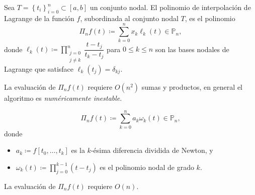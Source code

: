 \begin{frame}
	\begin{definition}
		Sea
		\begin{math}
			T=
			{
			\left\{
			t_{i}
			\right\}
			}^{n}_{i=0}
			\subset\left[a,b\right]
		\end{math}
		un conjunto nodal.
		El \alert{polinomio de interpolación de Lagrange} de la función $f$,
		subordinada al conjunto nodal $T$, es el polinomio
		\begin{equation*}
			\Pi_{n}
			f\left(t\right)\coloneqq
			\sum\limits_{k=0}^{n}
			x_{k}
			\ell_{k}\left(t\right)\in\mathbb{P}_{n},
		\end{equation*}
		donde
		\begin{math}
			\ell_{k}
			\left(t\right)\coloneqq
			\prod\limits_{\substack{j=0\\j\neq k}}^{n}
			\dfrac{t-t_{j}}{t_{k}-t_{j}}
		\end{math}
		para $0\leq k\leq n$ son las \alert{bases nodales de Lagrange}
		que satisface
		\begin{math}
			\ell_{k}
			\left(t_{j}\right)=
			\delta_{kj}
		\end{math}.

		La evaluación de $\Pi_{n}f\left(t\right)$ requiere
		$O\left(n^{2}\right)$ sumas y productos, en general el
		algoritmo es \emph{numéricamente inestable}.
	\end{definition}

	\begin{definition}
		\begin{equation*}
			\Pi_{n}
			f\left(t\right)\coloneqq
			\sum\limits_{k=0}^{n}
			a_{k}
			\omega_{k}\left(t\right)\in\mathbb{P}_{n},
		\end{equation*}
		donde
		\begin{itemize}
			\item

			      \begin{math}
				      a_{k}\coloneqq
				      f\left[t_{0},\ldots,t_{k}\right]
			      \end{math}
			      es la \alert{$k$-ésima diferencia dividida de Newton}, y

			\item

			      \begin{math}
				      \omega_{k}
				      \left(t\right)\coloneqq
				      \prod\limits_{j=0}^{k-1}
				      \left(
				      t-t_{j}
				      \right)
			      \end{math}
			      es el \alert{polinomio nodal de grado $k$}.
		\end{itemize}
		La evaluación de $\Pi_{n}f\left(t\right)$ requiere
		$O\left(n\right)$.
	\end{definition}
\end{frame}


